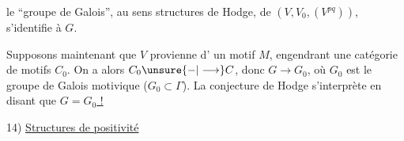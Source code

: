 le ``groupe de Galois'', au sens structures de
Hodge, de $(V,V_0,(V^{pq}))$, s'identifie à $G$.

Supposons maintenant que $V$ provienne d'
un motif $M$, engendrant une \inserted{$\otimes$-}catégorie de
motifs $C_0$. On a alors $C_0\unsure{-|\longrightarrow}C$, donc
$G\longrightarrow G_0$, où $G_0$ est le groupe de Galois
motivique ($G_0\subset\Gamma$). La conjecture de
Hodge s'interprète en disant que \uline{$G=G_0$ !}

14) \uline{Structures de positivité}
